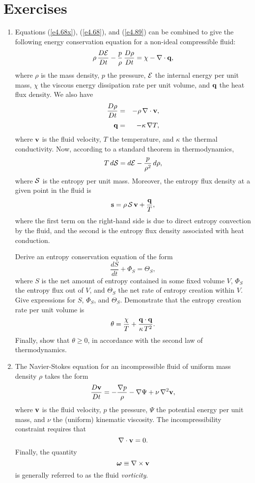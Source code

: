 \section{Exercises}
{\small 
\renewcommand{\theenumi}{2.\arabic{enumi}}
\begin{enumerate}
\item Equations (\ref{e4.68x}), (\ref{e4.68}), and (\ref{e4.89}) can be combined to give the following energy conservation equation
for a non-ideal compressible fluid:
$$
\rho\,\frac{D{\cal E}}{Dt} - \frac{p}{\rho}\,\frac{D\rho}{Dt} = \chi - \nabla\cdot{\bf q},
$$
where $\rho$ is the mass density, $p$ the pressure, ${\cal E}$ the internal energy per unit mass, $\chi$ the
viscous energy dissipation rate per unit volume, and ${\bf q}$ the heat flux density. We also have
\begin{eqnarray}
\frac{D\rho}{Dt} &=&-\rho\,\nabla\cdot{\bf v},\nonumber\\[0.5ex]
{\bf q}&=&-\kappa\,\nabla T,\nonumber
\end{eqnarray}
where ${\bf v}$ is the fluid velocity,  $T$  the temperature, and $\kappa$ the thermal conductivity. Now, according to a standard theorem  in thermodynamics,
$$
T\,d{\cal S} = d{\cal E}- \frac{p}{\rho^2}\,d\rho,
$$
where ${\cal S}$ is the entropy per unit mass. Moreover, the entropy flux density at a given point
in the fluid is
$$
{\bf s} = \rho\,{\cal S}\,{\bf v} + \frac{{\bf q}}{T},
$$
where the first term on the right-hand side is due to direct entropy convection by the fluid, and the second is the entropy
flux density associated with heat conduction. 

Derive an entropy conservation equation of the form
$$
\frac{dS}{dt} + \Phi_S = \Theta_S,
$$
where $S$ is the net amount of entropy contained in some fixed volume $V$, $\Phi_S$ the entropy flux out of $V$, and $\Theta_S$ the
net rate of entropy creation within $V$. Give expressions for $S$, $\Phi_S$, and $\Theta_S$. Demonstrate that
 the entropy creation rate per unit volume is
 $$
 \theta = \frac{\chi}{T} + \frac{{\bf q}\cdot{\bf q}}{\kappa\,T^2}.
 $$
 Finally, show that $\theta\geq 0$, in accordance with the second law of thermodynamics. 
 
 \item The Navier-Stokes equation for an incompressible fluid of uniform mass density $\rho$ takes the form
 $$
 \frac{D{\bf v}}{Dt} = -\frac{\nabla p}{\rho} - \nabla\Psi + \nu\,\nabla^2{\bf v},
 $$
 where ${\bf v}$ is the fluid velocity, $p$ the pressure, $\Psi$ the potential energy per unit mass, and $\nu$
 the (uniform) kinematic viscosity. The incompressibility constraint requires that
 $$
 \nabla\cdot{\bf v} = 0.
 $$
 Finally, the quantity
 $$
 \mbox{\boldmath$\omega$}\equiv \nabla\times {\bf v}
 $$
 is generally referred to as the fluid {\em vorticity}. 
 

\end{enumerate}}
